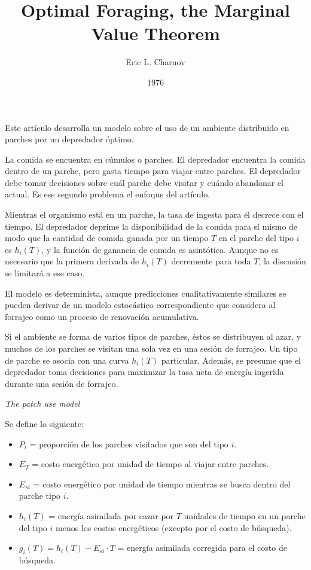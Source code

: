 \documentclass[a4paper,12pt]{article}
\title{Optimal Foraging, the Marginal Value Theorem}
\author{Eric L. Charnov}
\date{1976}
\begin{document}
{\scshape\bfseries \maketitle}

Este artículo desarrolla un modelo sobre el uso de un ambiente distribuido en parches por un depredador óptimo.

La comida se encuentra en cúmulos o parches. El depredador encuentra la comida dentro de un parche, pero gasta tiempo para viajar entre parches. El depredador debe tomar decisiones sobre cuál parche debe visitar y cuándo abandonar el actual. Es ese segundo problema el enfoque del artículo.

Mientras el organismo está en un parche, la tasa de ingesta para él decrece con el tiempo. El depredador deprime la disponibilidad de la comida para sí mismo de modo que la cantidad de comida ganada por un tiempo $T$ en el parche del tipo $i$ es $h_i(T)$, y la función de ganancia de comida es asintótica. Aunque no es necesario que la primera derivada de $h_i(T)$ decremente para  toda $T$, la discusión se limitará a ese caso.

El modelo es determinista, aunque predicciones cualitativamente similares se pueden derivar de un modelo estocástico correspondiente que considera al forrajeo como un proceso de renovación acumulativa. 

Si el ambiente se forma de varios tipos de parches, éstos se distribuyen al azar, y muchos de los parches se visitan una sola vez en una sesión de forrajeo. Un tipo de parche se asocia con una curva $h_i(T)$ particular. Además, se presume que el depredador toma decisiones para maximizar la tasa neta de energía ingerida durante una sesión de forrajeo.

{\itshape The patch use model}

Se define lo siguiente:
\begin{itemize}
	\item $P_i$ = proporción de los parches visitados que son del tipo $i$.
	\item $E_T$ =  costo energético por unidad de tiempo al viajar entre parches.
	\item $E_{si}$ = costo energético por unidad de tiempo mientras se busca dentro del parche tipo $i$.
	\item $h_i(T)$ = energía asimilada por cazar por $T$ unidades de tiempo en un parche del tipo $i$ menos los costos energéticos (excepto por el costo de búsqueda).
	\item $g_i(T) = h_i(T) - E_{si} \cdot T$ = energía asimilada corregida para el costo de búsqueda.
\end{itemize}
\end{document}
